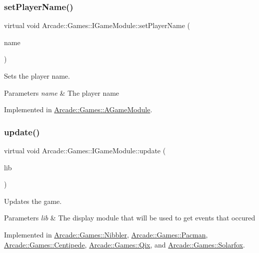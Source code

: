\subsubsection{\texorpdfstring{setPlayerName()}{setPlayerName()}}
{\footnotesize\ttfamily virtual void Arcade\+::\+Games\+::\+I\+Game\+Module\+::set\+Player\+Name (\begin{DoxyParamCaption}\item[{const std\+::string \&}]{name }\end{DoxyParamCaption})\hspace{0.3cm}{\ttfamily [pure virtual]}}



Sets the player name. 


\begin{DoxyParams}{Parameters}
{\em name} & The player name \\
\hline
\end{DoxyParams}


Implemented in \mbox{\hyperlink{classArcade_1_1Games_1_1AGameModule_abdbf4cf008033b5f339d9758d7f2b8a2}{Arcade\+::\+Games\+::\+A\+Game\+Module}}.

\mbox{\label{classArcade_1_1Games_1_1IGameModule_a421d1064fcc112dfc7ea025fc7f88aa7}} 
\subsubsection{\texorpdfstring{update()}{update()}}
{\footnotesize\ttfamily virtual void Arcade\+::\+Games\+::\+I\+Game\+Module\+::update (\begin{DoxyParamCaption}\item[{const \mbox{\hyperlink{classArcade_1_1Display_1_1IDisplayModule}{Arcade\+::\+Display\+::\+I\+Display\+Module}} \&}]{lib }\end{DoxyParamCaption})\hspace{0.3cm}{\ttfamily [pure virtual]}}



Updates the game. 


\begin{DoxyParams}{Parameters}
{\em lib} & The display module that will be used to get events that occured \\
\hline
\end{DoxyParams}


Implemented in \mbox{\hyperlink{classArcade_1_1Games_1_1Nibbler_a6a44a75ab1905647587d7a6314155955}{Arcade\+::\+Games\+::\+Nibbler}}, \mbox{\hyperlink{classArcade_1_1Games_1_1Pacman_aa1da58f8e97d6363bd4ef0538496490e}{Arcade\+::\+Games\+::\+Pacman}}, \mbox{\hyperlink{classArcade_1_1Games_1_1Centipede_a11a932a0abda301ae6037c6b97532e79}{Arcade\+::\+Games\+::\+Centipede}}, \mbox{\hyperlink{classArcade_1_1Games_1_1Qix_aab6bfb0ecf8571da19c4fcbfc9de263e}{Arcade\+::\+Games\+::\+Qix}}, and \mbox{\hyperlink{classArcade_1_1Games_1_1Solarfox_a87d7898dc7b5d8c658a18c45d35be991}{Arcade\+::\+Games\+::\+Solarfox}}.


